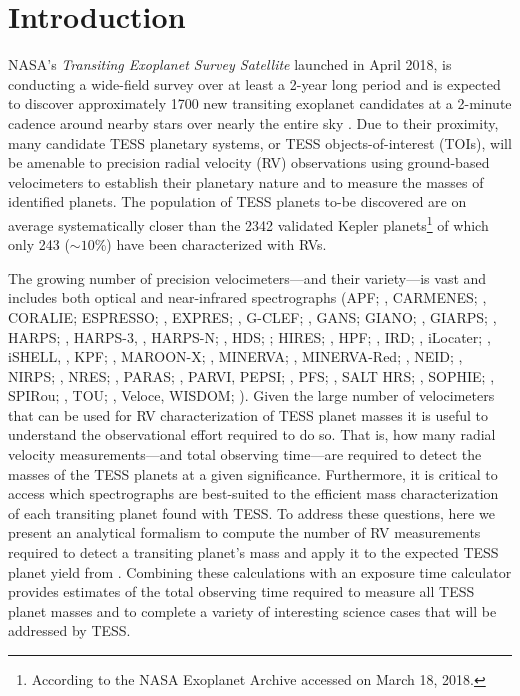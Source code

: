 \section{Introduction}
NASA's \emph{Transiting Exoplanet Survey Satellite} \citep[TESS; ][]{ricker15} launched in April 2018,
is conducting a wide-field survey over at least a 2-year long period and is expected to discover
approximately 1700 new transiting exoplanet candidates at a 2-minute cadence around nearby stars over
nearly the
entire sky \citep[][hereafter ]{sullivan15}. Due to their proximity,
many candidate TESS planetary systems, or TESS objects-of-interest (TOIs),
will be amenable to precision radial velocity (RV) observations using ground-based velocimeters to
establish their planetary nature and to measure the masses of identified planets.
The population of TESS planets to-be discovered are on average systematically closer than the 2342
validated Kepler planets\footnote{According to the NASA Exoplanet Archive accessed on March 18, 2018.}
of which only 243 ($\sim 10$\%) have been characterized with RVs.

The growing number of precision velocimeters---and their variety---is vast and includes both optical
and near-infrared spectrographs 
(APF; \citealt{vogt14},
CARMENES; \citealt{quirrenbach14},
CORALIE;
ESPRESSO; \citealt{pepe10},
EXPRES; \citealt{jurgenson16},
G-CLEF; \citealt{szentgyorgyi16},
GANS;
GIANO; \citealt{oliva06},
GIARPS; \citealt{claudi16},
HARPS; \citealt{mayor03},
HARPS-3, \citealt{thompson16},
HARPS-N; \citealt{costentino12},
HDS; \citealt{noguchi98};
HIRES; \citealt{vogt94},
HPF; \citealt{mahadevan12},
IRD; \citealt{kotani14},
iLocater; \citealt{crepp16},
iSHELL, \citealt{rayner12},
KPF; \citealt{gibson16},
MAROON-X; \citealt{seifahrt18},
MINERVA; \citealt{swift15},
MINERVA-Red; \citealt{sliski17},
NEID; \citealt{allen18},
NIRPS; \citealt{bouchy17},
NRES; \citealt{siverd16},
PARAS; \citealt{chakraborty08},
PARVI,
PEPSI; \citealt{strassmeier15},
PFS; \citealt{crane10},
SALT HRS; \citealt{crause14},
SOPHIE; \citealt{perruchot11},
SPIRou; \citealt{artigau14},
TOU; \citealt{ge16},
Veloce,
WISDOM; \citealt{fzresz16}).
Given the large number of velocimeters that can be used for RV characterization of TESS
planet masses it is useful to understand the observational effort required to do so. That is, how many radial
velocity measurements---and total observing time---are required to detect the masses of the TESS 
planets at a given significance. Furthermore,
it is critical to access which spectrographs are best-suited to the efficient mass characterization of
each transiting planet found with TESS. To address these questions, here we present an analytical formalism
to compute the number of RV measurements required to detect a transiting planet's mass and apply it to the
expected TESS planet yield from .
Combining these calculations with an exposure time calculator provides estimates of the total
observing time required to measure all TESS planet masses and to complete a variety of interesting science
cases that will be addressed by TESS.

